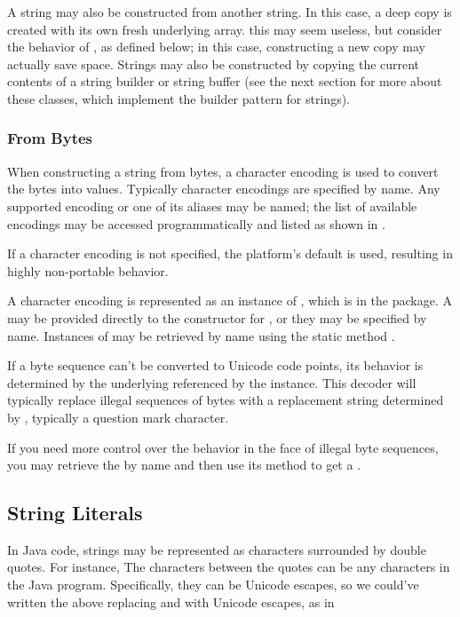 A string may also be constructed from another string.  In this case, a
deep copy is created with its own fresh underlying array.  this may
seem useless, but consider the behavior of , as
defined below; in this case, constructing a new copy may actually save
space.  Strings may also be constructed by copying the current
contents of a string builder or string buffer (see the next section
for more about these classes, which implement the builder pattern for
strings).

\subsubsection{From Bytes}

When constructing a string from bytes, a character encoding is used to
convert the bytes into  values.  Typically character
encodings are specified by name.  Any supported encoding or one of its
aliases may be named; the list of available encodings may be accessed
programmatically and listed as shown in .

If a character encoding is not specified, the platform's default is
used, resulting in highly non-portable behavior.

A character encoding is represented as an instance of ,
which is in the  package.  A  may
be provided directly to the constructor for , or they may
be specified by name.  Instances of  may be retrieved by
name using the static method .

If a byte sequence can't be converted to Unicode code points, its
behavior is determined by the underlying 
referenced by the  instance.  This decoder will
typically replace illegal sequences of bytes with a replacement string
determined by , typically a
question mark character.  

If you need more control over the behavior in the face of illegal byte
sequences, you may retrieve the  by name and then use
its  method to get a .

\subsection{String Literals}

In Java code, strings may be represented as characters surrounded
by double quotes.  For instance,
%
%
The characters between the quotes can be any characters in the Java
program.  Specifically, they can be Unicode escapes, so we could've
written the above replacing  and  with Unicode
escapes, as in
%

